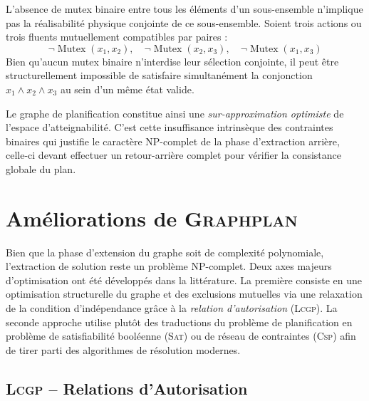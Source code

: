 \begin{remark}
    L'absence de mutex binaire entre tous les éléments d'un sous-ensemble n'implique pas la réalisabilité physique conjointe de ce sous-ensemble. Soient trois actions ou trois fluents mutuellement compatibles par paires :
        \begin{equation}
            \neg \operatorname{Mutex}(x_1, x_2), \quad \neg \operatorname{Mutex}(x_2, x_3), \quad \neg \operatorname{Mutex}(x_1, x_3)
        \end{equation}
    Bien qu'aucun mutex binaire n'interdise leur sélection conjointe, il peut être structurellement impossible de satisfaire simultanément la conjonction $x_1 \land x_2 \land x_3$ au sein d'un même état valide.

    Le graphe de planification constitue ainsi une \emph{sur-approximation optimiste} de l'espace d'atteignabilité. C'est cette insuffisance intrinsèque des contraintes binaires qui justifie le caractère NP-complet de la phase d'extraction arrière, celle-ci devant effectuer un retour-arrière complet pour vérifier la consistance globale du plan.
\end{remark}




\section{Améliorations de \textsc{Graphplan}}

Bien que la phase d'extension du graphe soit de complexité polynomiale, l'extraction de solution reste un problème NP-complet. Deux axes majeurs d'optimisation ont été développés dans la littérature. 
La première consiste en une optimisation structurelle du graphe et des exclusions mutuelles via une relaxation de la condition d'indépendance grâce à la \emph{relation d'autorisation} (\textsc{Lcgp}).
La seconde approche utilise plutôt des traductions du problème de planification en problème de satisfiabilité booléenne (\textsc{Sat}) ou de réseau de contraintes (\textsc{Csp}) afin de tirer parti des algorithmes de résolution modernes.

\subsection{\textsc{Lcgp} -- Relations d'Autorisation}

